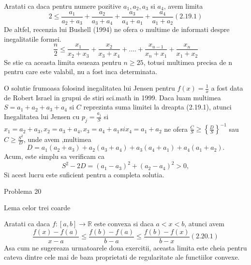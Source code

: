 \documentclass[a4paper,12pt,oneside]{report}
\begin{document}
Aratati ca daca pentru numere pozitive
 \(a_{1} , a_{2} , a_{3}\)  si \(  a_{4}\), avem limita
 \begin{displaymath}
     2\leq \frac{a_{1}}{a_{2} + a_{3}} + \frac{a_{2}}{a_{3} + a_{4}} + \frac{a_{3}}{a_{4} + a_{1}} + \frac{a_{4}}{a_{1} + a_{2}} (2.19.1)
 \end{displaymath}
De altfel, recenzia lui Bushell (1994) ne ofera o multime de informati despre inegalitatile formei.
\begin{displaymath}
    \frac{n}{2} \leq \frac{x_{1}}{x_{2} + x_{3}} + \frac{x_{2}}{x_{3} + x_{4}} + ....+ \frac{x_{n - 1}}{x_{n} + x_{1}} + \frac{x_{n}}{x_{1} + x_{2}}
\end{displaymath}
Se stie ca aceasta limita esueaza pentru  \(n\geq 25\), totusi multimea precisa de n pentru care este valabil, nu a fost inca determinata. 

O solutie frumoasa folosind inegalitatea lui Jensen pentru \(f\left ( x \right ) = \frac{1}{x}\) a fost data de Robert Israel in grupui de stiri sci.math in 1999. Daca luam multimea \(S = a_{1} + a_{2} + a_{3} + a_{4}\) si \(C\) reprezinta suma limitei la dreapta (2.19.1), atunci Inegalitatea lui Jensen cu \(p_{j} = \frac{a_{j}}{S}\) si \(x_{1} = a_{2} + a_{3}, x_{2} = a_{3} + a_{4} , x_{3} = a_{4} + a_{1} si x_{4} = a_{1} + a_{2}\) ne ofera \(\frac{C}{S} \geq \left \{ \frac{D}{S} \right \}^{-1}\) sau \(C \geq \frac{S^{2}}{D}\), unde avem ,multimea 
\begin{displaymath}
    D = a_{1}\left ( a_{2} + a_{3} \right ) + a_{2}\left ( a_{3} + a_{4} \right ) + a_{3}\left ( a_{4} + a_{1} \right ) + a_{4}\left ( a_{1} + a_{2} \right ).
\end{displaymath}
Acum, este simplu sa verificam ca 
\begin{displaymath}
    S^{2} - 2D = \left ( a_{1} - a_{3} \right )^{2} + \left ( a_{2} - a_{4} \right )^{2}> 0, 
\end{displaymath}
Si acest lucru este suficient pentru a completa solutia. 


Problema 20 
	
Lema celor trei coarde 

Aratati ca daca \(f : \left [ a,b \right ]  \to \mathbb{R}\) este convexa si daca \(a <  x < b\), atunci avem
\begin{displaymath}
    \frac{f\left ( x \right ) - f\left ( a \right )}{x - a} \leq \frac{f\left ( b \right ) - f\left ( a \right )}{b - a} \leq  \frac{f\left ( b \right ) - f\left ( x \right )}{b - x}   ( 2.20.1)
\end{displaymath}
Asa cum ne sugereaza urmatoarele doua exercitii, aceasta limita este cheia pentru cateva dintre cele mai de baza proprietati de regularitate ale functiilor convexe. 
\end{document}

